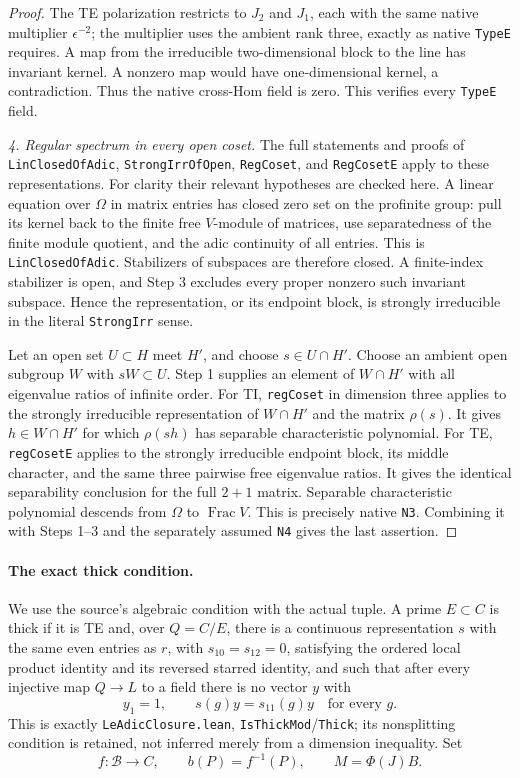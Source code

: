 \begin{proof}
The TE polarization restricts to \(J_2\) and \(J_1\), each
with the same native multiplier \(\epsilon^{-2}\); the multiplier
uses the ambient rank three, exactly as native \texttt{TypeE}
requires.  A map from the irreducible two-dimensional block to
the line has invariant kernel.  A nonzero map would have
one-dimensional kernel, a contradiction.  Thus the native
cross-Hom field is zero.  This verifies every \texttt{TypeE} field.

\emph{4. Regular spectrum in every open coset.}
The full statements and proofs of \texttt{LinClosedOfAdic},
\texttt{StrongIrrOfOpen}, \texttt{RegCoset}, and
\texttt{RegCosetE} apply to these representations.
For clarity their relevant hypotheses are checked here.
A linear equation over \(\Omega\) in matrix entries has closed
zero set on the profinite group: pull its kernel back to the
finite free \(V\)-module of matrices, use separatedness of
the finite module quotient, and the adic continuity of all
entries.  This is \texttt{LinClosedOfAdic}.  Stabilizers of
subspaces are therefore closed.  A finite-index stabilizer is
open, and Step 3 excludes every proper nonzero such invariant
subspace.  Hence the representation, or its endpoint block,
is strongly irreducible in the literal \texttt{StrongIrr} sense.

Let an open set \(U\subset H\) meet \(H'\), and choose
\(s\in U\cap H'\).  Choose an ambient open subgroup \(W\)
with \(sW\subset U\).  Step 1 supplies an element of
\(W\cap H'\) with all eigenvalue ratios of infinite order.
For TI, \texttt{regCoset} in dimension three applies to the
strongly irreducible representation of \(W\cap H'\) and the
matrix \(\rho(s)\).  It gives \(h\in W\cap H'\) for which
\(\rho(sh)\) has separable characteristic polynomial.
For TE, \texttt{regCosetE} applies to the strongly irreducible
endpoint block, its middle character, and the same three
pairwise free eigenvalue ratios.  It gives the identical
separability conclusion for the full \(2+1\) matrix.
Separable characteristic polynomial descends from \(\Omega\)
to \(\operatorname{Frac}V\).  This is precisely native
\texttt{N3}.  Combining it with Steps 1--3 and the separately
assumed \texttt{N4} gives the last assertion.
\end{proof}

\paragraph{The exact thick condition.}
We use the source's algebraic condition with the actual tuple.
A prime \(E\subset C\) is thick if it is TE and, over \(Q=C/E\),
there is a continuous representation \(s\) with the same even
entries as \(r\), with \(s_{10}=s_{12}=0\), satisfying the
ordered local product identity and its reversed starred identity,
and such that after every injective map \(Q\to L\) to a field
there is no vector \(y\) with
\[
 y_1=1,\qquad s(g)y=s_{11}(g)y\quad\text{for every }g.
\tag{G104.6}
\]
This is exactly \texttt{LeAdicClosure.lean},
\texttt{IsThickMod}/\texttt{Thick}; its nonsplitting condition
is retained, not inferred merely from a dimension inequality.
Set
\[
 f:\mathscr B\longrightarrow C,
 \qquad b(P)=f^{-1}(P),\qquad M=\Phi(J)B.
\tag{G104.7}
\]

